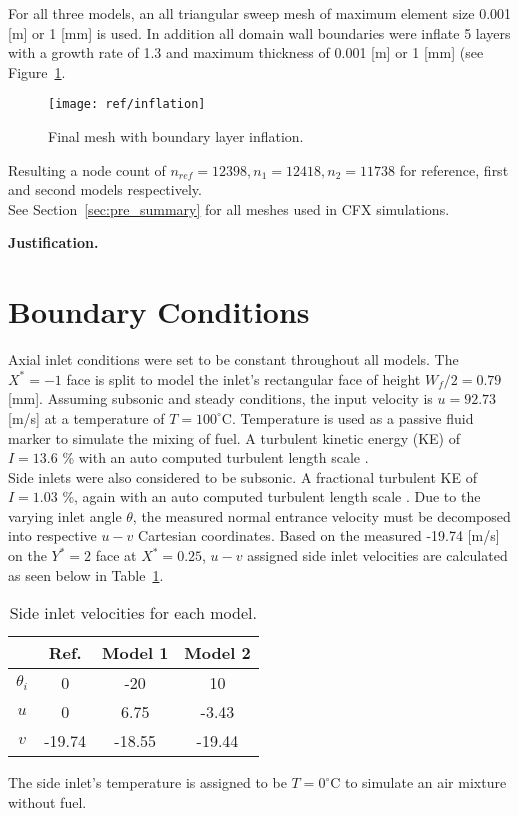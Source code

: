 For all three models, an all triangular sweep mesh of maximum element size 0.001 [m] or 1 [mm] is used. In addition all domain wall boundaries were inflate 5 layers with a growth rate of 1.3 and maximum thickness of 0.001 [m] or 1 [mm] (see Figure~\ref{fig:inflation}.
\begin{figure}[H]
	\centering
	\texttt{[image: ref/inflation]}
	\caption[Final mesh with boundary layer inflation.]{Final mesh with boundary layer inflation.\cite{cfx}}
	\label{fig:inflation}
\end{figure}

Resulting a node count of $n_{ref}= 12398, n_1= 12418, n_2=11738$ for reference, first and second models respectively.\\

See Section~\ref{sec:pre_summary} for all meshes used in CFX simulations.

\textbf{Justification.}
\section{Boundary Conditions}
\label{sec:pre_bc}

Axial inlet conditions were set to be constant throughout all models. The $X^*=-1$ face is split to model the inlet's rectangular face of height $W_f/2=0.79$ [mm]. Assuming subsonic and steady conditions, the input velocity is $u=92.73$ [m/s] \cite{projfaq} at a temperature of $T=100 ^{\circ}$C. Temperature is used as a passive fluid marker to simulate the mixing of fuel. A turbulent kinetic energy (KE) of $I=13.6$ \% with an auto computed turbulent length scale \cite{projfaq}.\\

Side inlets were also considered to be subsonic. A fractional turbulent KE of $I=1.03$ \%, again with an auto computed turbulent length scale \cite{projfaq}. Due to the varying inlet angle $\theta$, the measured normal entrance velocity must be decomposed into respective $u-v$ Cartesian coordinates. Based on the measured -19.74 [m/s] on the $Y^*=2$ face at $X^*=0.25$, $u-v$ assigned side inlet velocities are calculated as seen below in Table~\ref{tab:sideinletbc}.
\begin{table}[H]
	\centering
	\caption{Side inlet velocities for each model.}
	\begin{tabular}{cccc}
		\toprule		
		\multicolumn{1}{c}{} & \textbf{Ref.} & \textbf{Model 1} & \textbf{ Model 2} \\
		\midrule
		$\theta_i$	& 0            & -20             & 10		\\
		$u$			& 0            & 6.75            & -3.43	\\
		$v$ 		& -19.74       & -18.55          & -19.44	\\
		\bottomrule
	\end{tabular}
	\label{tab:sideinletbc}
\end{table}
The side inlet's temperature is assigned to be $T=0 ^{\circ}$C to simulate an air mixture without fuel.


